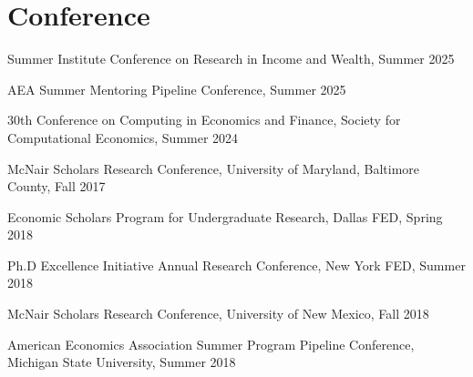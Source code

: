 
\section{Conference} %
\label{sec:conference}
\vspace{-0.25in}
\begin{outerlist}
  \item Summer Institute Conference on Research in Income and Wealth, Summer 2025
  \item AEA Summer Mentoring Pipeline Conference, Summer 2025
    \item 30th Conference on Computing in Economics and Finance, Society for Computational Economics, Summer 2024
    \item McNair Scholars Research Conference, University of Maryland, Baltimore County, Fall 2017
    \item Economic Scholars Program for Undergraduate Research, Dallas FED, Spring 2018
    \item Ph.D Excellence Initiative Annual Research Conference, New York FED, Summer 2018
    \item McNair Scholars Research Conference, University of New Mexico, Fall 2018
    \item American Economics Association Summer Program Pipeline Conference, Michigan State University, Summer 2018
\end{outerlist}

